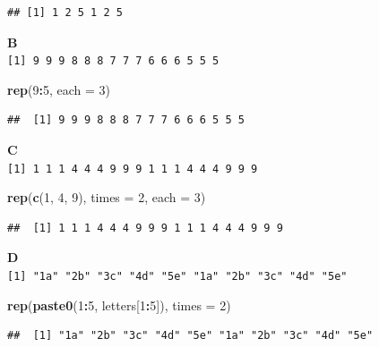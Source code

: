 \documentclass[]{book}
\newenvironment{Shaded}{\begin{snugshade}}{\end{snugshade}}
\newcommand{\DataTypeTok}[1]{\textcolor[rgb]{0.13,0.29,0.53}{#1}}
\newcommand{\DecValTok}[1]{\textcolor[rgb]{0.00,0.00,0.81}{#1}}
\newcommand{\KeywordTok}[1]{\textcolor[rgb]{0.13,0.29,0.53}{\textbf{#1}}}
\newcommand{\NormalTok}[1]{#1}
\newcommand{\OperatorTok}[1]{\textcolor[rgb]{0.81,0.36,0.00}{\textbf{#1}}}
\begin{document}
\begin{verbatim}
## [1] 1 2 5 1 2 5
\end{verbatim}

\textbf{B}\\
\texttt{{[}1{]}\ 9\ 9\ 9\ 8\ 8\ 8\ 7\ 7\ 7\ 6\ 6\ 6\ 5\ 5\ 5}

\begin{Shaded}
\begin{Highlighting}[]
\KeywordTok{rep}\NormalTok{(}\DecValTok{9}\OperatorTok{:}\DecValTok{5}\NormalTok{, }\DataTypeTok{each =} \DecValTok{3}\NormalTok{)}
\end{Highlighting}
\end{Shaded}

\begin{verbatim}
##  [1] 9 9 9 8 8 8 7 7 7 6 6 6 5 5 5
\end{verbatim}

\textbf{C}\\
\texttt{{[}1{]}\ 1\ 1\ 1\ 4\ 4\ 4\ 9\ 9\ 9\ 1\ 1\ 1\ 4\ 4\ 4\ 9\ 9\ 9}

\begin{Shaded}
\begin{Highlighting}[]
\KeywordTok{rep}\NormalTok{(}\KeywordTok{c}\NormalTok{(}\DecValTok{1}\NormalTok{, }\DecValTok{4}\NormalTok{, }\DecValTok{9}\NormalTok{), }\DataTypeTok{times =} \DecValTok{2}\NormalTok{, }\DataTypeTok{each =} \DecValTok{3}\NormalTok{)}
\end{Highlighting}
\end{Shaded}

\begin{verbatim}
##  [1] 1 1 1 4 4 4 9 9 9 1 1 1 4 4 4 9 9 9
\end{verbatim}

\textbf{D}\\
\texttt{{[}1{]}\ "1a"\ "2b"\ "3c"\ "4d"\ "5e"\ "1a"\ "2b"\ "3c"\ "4d"\ "5e"}

\begin{Shaded}
\begin{Highlighting}[]
\KeywordTok{rep}\NormalTok{(}\KeywordTok{paste0}\NormalTok{(}\DecValTok{1}\OperatorTok{:}\DecValTok{5}\NormalTok{, letters[}\DecValTok{1}\OperatorTok{:}\DecValTok{5}\NormalTok{]), }\DataTypeTok{times =} \DecValTok{2}\NormalTok{)}
\end{Highlighting}
\end{Shaded}

\begin{verbatim}
##  [1] "1a" "2b" "3c" "4d" "5e" "1a" "2b" "3c" "4d" "5e"
\end{verbatim}
\end{document}

